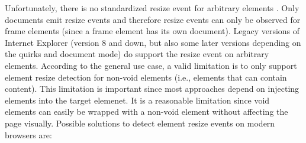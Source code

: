 \documentclass[a4paper,11pt]{kth-mag}
\begin{document}
        Unfortunately, there is no standardized resize event for arbitrary \glspl{element} \cite{w3c_dom2_events}.
        Only \glspl{document} emit resize events and therefore resize events can only be observed for frame elements (since a frame element has its own document).
        Legacy versions of Internet Explorer (version 8 and down, but also some later versions depending on the quirks and \gls{document} mode) do support the resize event on arbitrary \glspl{element}.
        According to the general use case, a valid limitation is to only support element resize detection for non-void elements (i.e., elements that can contain content).
        This limitation is important since most approaches depend on injecting elements into the target elemenet.
        It is a reasonable limitation since void elements can easily be wrapped with a non-void element without affecting the page visually.
        Possible solutions to detect element resize events on modern browsers are:
\end{document}

